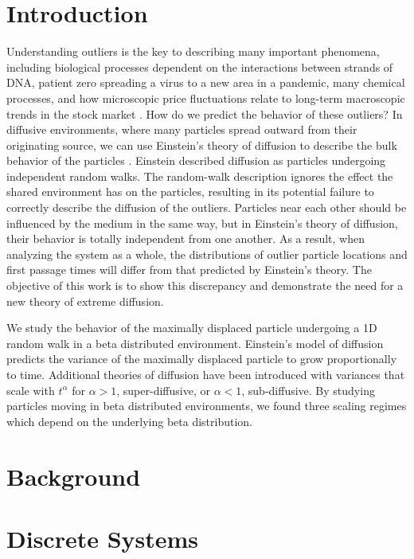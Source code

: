 \documentclass[%
 reprint,
 amsmath,amssymb,
 longbibliography,
 aps,
]{revtex4-1}
\begin{document}
\section{Introduction}
Understanding outliers is the key to describing many important phenomena, including biological processes dependent on the interactions between strands of DNA, patient zero spreading a virus to a new area in a pandemic, many chemical processes, and how microscopic price fluctuations relate to long-term macroscopic trends in the stock market \cite{label1, label2, label3, label4}. How do we predict the behavior of these outliers? In diffusive environments, where many particles spread outward from their originating source, we can use Einstein’s theory of diffusion to describe the bulk behavior of the particles \cite{label5, label6}. Einstein described diffusion as particles undergoing independent random walks. The random-walk description ignores the effect the shared environment has on the particles, resulting in its potential failure to correctly describe the diffusion of the outliers. Particles near each other should be influenced by the medium in the same way, but in Einstein’s theory of diffusion, their behavior is totally independent from one another. As a result, when analyzing the system as a whole, the distributions of outlier particle locations and first passage times will differ from that predicted by Einstein’s theory. The objective of this work is to show this discrepancy and demonstrate the need for a new theory of extreme diffusion. \par
We study the behavior of the maximally displaced particle undergoing a 1D random walk in a beta distributed environment. Einstein's model of diffusion predicts the variance of the maximally displaced particle to grow proportionally to time. Additional theories of diffusion have been introduced with variances that scale with $t^{\alpha}$ for $\alpha>1$, super-diffusive, or $\alpha<1$, sub-diffusive. By studying particles moving in beta distributed environments, we found three scaling regimes which depend on the underlying beta distribution.

\section{Background}

\section{Discrete Systems}
\end{document}
